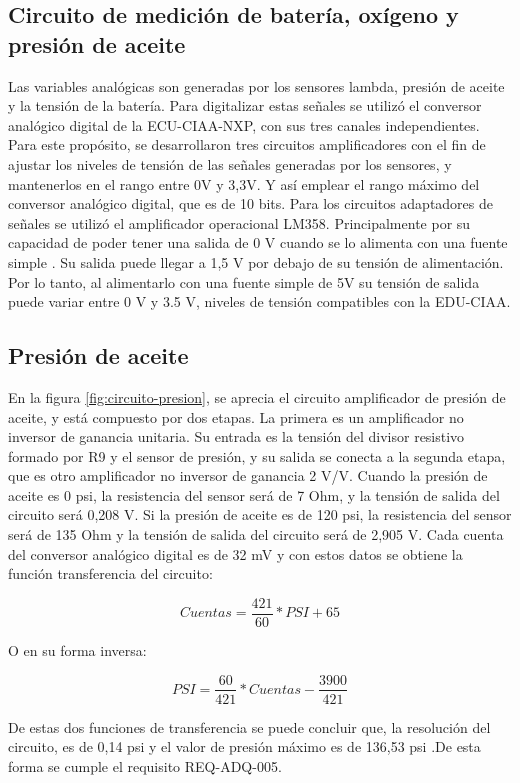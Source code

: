 \subsection{Circuito de medición de batería, oxígeno y presión de aceite}

Las variables analógicas son generadas por los sensores lambda, presión de aceite y la tensión de la batería. Para digitalizar estas señales se utilizó el conversor analógico digital de la ECU-CIAA-NXP, con sus tres canales independientes. Para este propósito, se desarrollaron tres circuitos amplificadores con el fin de ajustar los niveles de tensión de las señales generadas por los sensores, y mantenerlos en el rango entre 0V y 3,3V. Y así emplear el rango máximo del conversor analógico digital, que es de 10 bits. Para los circuitos adaptadores de señales se utilizó el amplificador operacional LM358. Principalmente por su capacidad de poder tener una salida de 0 V cuando se lo alimenta con una fuente simple \cite{lm358}. Su salida puede llegar a 1,5 V por debajo de su tensión de alimentación. Por lo tanto, al alimentarlo con una fuente simple de 5V su tensión de salida puede variar entre 0 V y 3.5 V, niveles de tensión compatibles con la EDU-CIAA.

\subsection{Presión de aceite}

En la figura \ref{fig:circuito-presion}, se aprecia el circuito amplificador de presión de aceite, y está compuesto por dos etapas. La primera es un amplificador no inversor de ganancia unitaria. Su entrada es la tensión del divisor resistivo formado por R9 y el sensor de presión, y su salida se conecta a la segunda etapa, que es otro amplificador no inversor de ganancia 2 V/V.
Cuando la presión de aceite es 0 psi, la resistencia del sensor será de 7 Ohm, y la tensión de salida del circuito será 0,208 V. Si la presión de aceite es de 120 psi, la resistencia del sensor será de 135 Ohm y la tensión de salida del circuito será de 2,905 V. Cada cuenta del conversor analógico digital es de 32 mV y con estos datos se obtiene la función transferencia del circuito:

\[ Cuentas = \frac{421}{60} * PSI + 65\]

O en su forma inversa:

\[ PSI = \frac{60}{421} * Cuentas - \frac{3900}{421} \]

De estas dos funciones de transferencia se puede concluir que, la resolución del circuito, es de 0,14 psi y el valor de presión máximo es de 136,53 psi .De esta forma se cumple el requisito REQ-ADQ-005.

